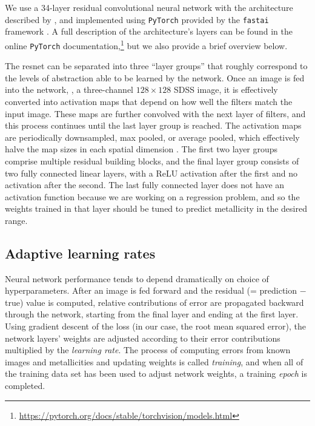 \documentclass[fleqn,usenatbib]{mnras}
\begin{document}
We use a 34-layer residual convolutional neural network with the architecture described by \cite{He2015}, and implemented using \texttt{PyTorch} \citep[version 0.3.1;][]{pytorch} provided by the \texttt{fastai} framework \citep[version 0.7;][]{fastai}.
A full description of the architecture's layers can be found in the online \texttt{PyTorch} documentation,\footnote{\url{https://pytorch.org/docs/stable/torchvision/models.html}} but we also provide a brief overview below.

The resnet can be separated into three ``layer groups'' that roughly correspond to the levels of abstraction able to be learned by the network. Once an image is fed into the network, \eg, a three-channel $128\times 128$ SDSS image, it is effectively converted into activation maps that depend on how well the filters match the input image. These maps are further convolved with the next layer of filters, and this process continues until the last layer group is reached. The activation maps are periodically downsampled, max pooled, or average pooled, which effectively halve the map sizes in each spatial dimension \citep[for more about pooling layers in CNNs, see][]{Scherer2010}. The first two layer groups comprise multiple residual building blocks, and the final layer group consists of two fully connected linear layers, with a ReLU activation after the first and no activation after the second. The last fully connected layer does not have an activation function because we are working on a regression problem, and so the weights trained in that layer should be tuned to predict metallicity in the desired range.

\subsection{Adaptive learning rates}
Neural network performance tends to depend dramatically on choice of hyperparameters. After an image is fed forward and the residual (= prediction $-$ true) value is computed, relative contributions of error are propagated backward through the network, starting from the final layer and ending at the first layer. Using gradient descent of the loss (in our case, the root mean squared error), the network layers' weights are adjusted according to their error contributions multiplied by the \textit{learning rate}. The process of computing errors from known images and metallicities and updating weights is called \textit{training}, and when all of the training data set has been used to adjust network weights, a training \textit{epoch} is completed.
\end{document}

